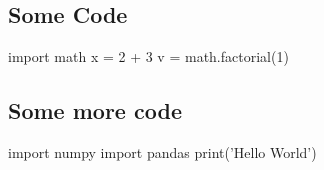 \documentclass[12pt]{article}
\begin{document}
\subsection{Some Code}
\renewcommand{\baselinestretch}{1}\normalsize
\begin{python}[breaklines,basicstyle=\ttfamily]
import math
x = 2 + 3
v = math.factorial(1)

\end{python}

\subsection{Some more code}
\renewcommand{\baselinestretch}{1}\normalsize
\begin{python}[breaklines,basicstyle=\ttfamily]
import numpy
import pandas
print('Hello World')
\end{python}



\end{document}
